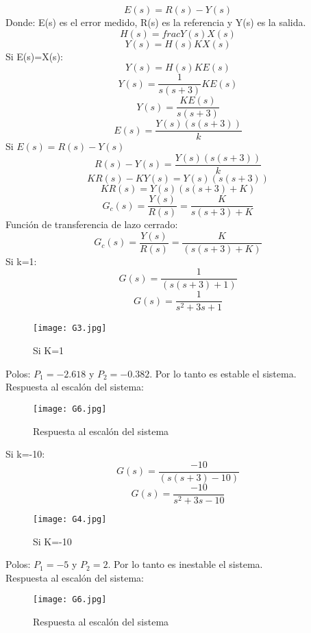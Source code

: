 $$E(s)=R(s)-Y(s)$$
Donde: E(s) es el error medido, R(s) es la referencia y Y(s) es la salida.
$$H(s)=frac{Y(s)}{X(s)}$$
$$Y(s)=H(s)KX(s)$$
Si E(s)=X(s):
$$Y(s)=H(s)KE(s)$$
$$Y(s)=\frac{1}{s(s+3)}KE(s)$$
$$Y(s)=\frac{KE(s)}{s(s+3)}$$
$$E(s)=\frac{Y(s)(s(s+3))}{k}$$
Si $E(s)=R(s)-Y(s)$
$$R(s)-Y(s)=\frac{Y(s)(s(s+3))}{k}$$
$$KR(s)-KY(s)=Y(s)(s(s+3))$$
$$KR(s)=Y(s)(s(s+3)+K)$$
$$G_{c}(s)=\frac{Y(s)}{R(s)}=\frac{K}{s(s+3)+K}$$
Función de transferencia de lazo cerrado:
$$G_{c}(s)=\frac{Y(s)}{R(s)}=\frac{K}{(s(s+3)+K)}$$	
Si k=1:
$$G(s)=\frac{1}{(s(s+3)+1)}$$	
$$G(s)=\frac{1}{s^{2}+3s+1}$$	

\begin{figure}[H]
	\centering
	\texttt{[image: G3.jpg]}\
	\caption{{Si K=1}}
	\label{fig:salidaTs001-6}
\end{figure}
Polos: $P_{1}=-2.618$ y $P_{2}=-0.382$. Por lo tanto es estable el sistema.\\
Respuesta al escalón del sistema:\\

\begin{figure}[H]
	\centering
	\texttt{[image: G6.jpg]}
	\caption{{Respuesta al escalón del sistema}}
	\label{fig:salidaTs001-6}
\end{figure}


Si k=-10:
$$G(s)=\frac{-10}{(s(s+3)-10)}$$	
$$G(s)=\frac{-10}{s^{2}+3s-10}$$

\begin{figure}[H]
	\centering
	\texttt{[image: G4.jpg]}
	\caption{{Si K=-10}}
	\label{fig:salidaTs001-6}
\end{figure}


Polos: $P_{1}=-5$ y $P_{2}=2$. Por lo tanto es inestable el sistema.\\
Respuesta al escalón del sistema:

\begin{figure}[H]
	\centering
	\texttt{[image: G6.jpg]}
	\caption{{Respuesta al escalón del sistema}}
	\label{fig:salidaTs001-7}
\end{figure}